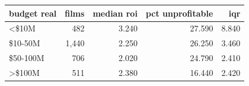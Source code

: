 \begin{tabular}{lrrrr}
\toprule
budget real & films & median roi & pct unprofitable & iqr \\
\midrule
<\$10M & 482 & 3.240 & 27.590 & 8.840 \\
\$10-50M & 1,440 & 2.250 & 26.250 & 3.460 \\
\$50-100M & 706 & 2.020 & 24.790 & 2.410 \\
>\$100M & 511 & 2.380 & 16.440 & 2.420 \\
\bottomrule
\end{tabular}